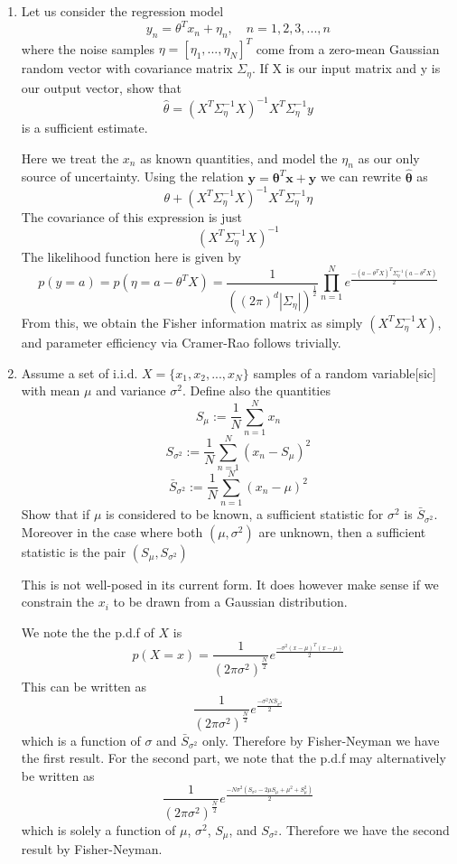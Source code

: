 \documentclass{article}
\newcommand{\chapternumber}{3}
\newenvironment{QandA}{\begin{enumerate}[label=\chapternumber.\arabic*]\bfseries\boldmath}
	{\end{enumerate}}
\newenvironment{answered}{\par\bigskip\normalfont\unboldmath}{}
\begin{document}
\begin{QandA}
		\item Let us consider the regression model
		\[y_n=\theta^Tx_n + \eta_n,\quad n=1,2,3,...,n\]
		where the noise samples $\eta=[\eta_1,...,\eta_N]^T$ come from a zero-mean Gaussian random vector with covariance matrix $\Sigma_\eta$. If X is our input matrix and y is our output vector, show that 
		\[\hat\theta=(X^T\Sigma_\eta^{-1}X)^{-1}X^T\Sigma_\eta^{-1} y\]
		is a sufficient estimate.
		
		\begin{answered}
			Here we treat the $x_n$ as known quantities, and model the $\eta_n$ as our only source of uncertainty. Using the relation $\textbf{y}=\boldsymbol{\theta}^T\textbf{x}+\textbf{y}$ we can rewrite $\boldsymbol{\hat{\theta}}$ as
			\[\theta+(X^T\Sigma_\eta^{-1}X)^{-1}X^T\Sigma_\eta^{-1} \eta\]
			The covariance of this expression is just
			\[(X^T\Sigma_\eta^{-1}X)^{-1}\]
			\newline
			The likelihood function here is given by 
			\[p(y=a)=p(\eta=a-\theta^TX)=\frac{1}{((2\pi)^d |\Sigma_\eta|)^{\frac{1}{2}}}\prod_{n=1}^{N}e^\frac{-(a-\theta^TX)^T\Sigma_\eta^{-1} (a-\theta^TX)}{2}\]
			From this, we obtain the Fisher information matrix as simply $(X^T\Sigma_\eta^{-1}X)$, and parameter efficiency via Cramer-Rao follows trivially.
		\end{answered}
	
		\item Assume a set of i.i.d. $X=\{x_1,x_2,...,x_N\}$ samples of a random variable[sic] with mean $\mu$ and variance $\sigma^2$. Define also the quantities
		\[S_\mu:=\frac{1}{N}\sum_{n=1}^{N}x_n\]
		\[S_{\sigma^2}:=\frac{1}{N}\sum_{n=1}^{N}(x_n-S_\mu)^2\]
		\[\bar{S}_{\sigma^2}:=\frac{1}{N}\sum_{n=1}^{N}(x_n-\mu)^2\]
		Show that if $\mu$ is considered to be known, a sufficient statistic for $\sigma^2$ is $\bar S_{\sigma^2}$. Moreover in the case where both $(\mu,\sigma^2)$ are unknown, then a sufficient statistic is the pair $(S_\mu,S_{\sigma^2})$
		
		\begin{answered}
			This is not well-posed in its current form. It does however make sense if we constrain the $x_i$ to be drawn from a Gaussian distribution. 
			
			We note the the p.d.f of $X$ is 
			\[p(X=x)=\frac{1}{(2\pi\sigma^2)^\frac{N}{2}}e^\frac{-\sigma^2(x-\mu)^T(x-\mu)}{2}\]
			This can be written as
			\[\frac{1}{(2\pi\sigma^2)^\frac{N}{2}}e^\frac{-\sigma^2 N\bar{S}_{\sigma^2}}{2}\]
			which is a function of $\sigma$ and $\bar{S}_{\sigma^2}$ only. Therefore by Fisher-Neyman we have the first result.
			For the second part, we note that the p.d.f may alternatively be written as
			\[\frac{1}{(2\pi\sigma^2)^\frac{N}{2}}e^\frac{-N\sigma^2(S_{\sigma^2}-2\mu S_\mu+\mu^2+S_\mu^2)}{2}\]
			which is solely a function of $\mu$, $\sigma^2$, $S_\mu$, and $S_{\sigma^2}$. Therefore we have the second result by Fisher-Neyman. 
		\end{answered}
	

\end{QandA}
\end{document}
